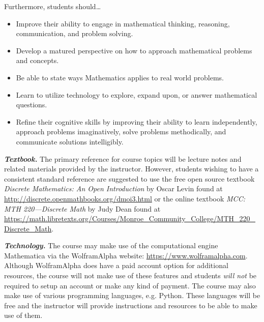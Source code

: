\documentclass[11pt,letterpaper]{article}
\begin{document}
Furthermore, students should\dots
	\begin{itemize} \itemsep=0.25ex
	\item  Improve their ability to engage in mathematical thinking, reasoning, communication, and problem solving.
	\item Develop a matured perspective on how to approach mathematical problems and concepts.
	\item Be able to state ways Mathematics applies to real world problems.
	\item Learn to utilize technology to explore, expand upon, or answer mathematical questions.
	\item Refine their cognitive skills by improving their ability to learn independently, approach problems imaginatively, solve problems methodically, and communicate solutions intelligibly.
	\end{itemize}
\sectionbreak



{\itshape\bfseries\color{stacred}Textbook.} The primary reference for course topics will be lecture notes and related materials provided by the instructor. However, students wishing to have a consistent standard reference are suggested to use the free open source textbook \textit{Discrete Mathematics: An Open Introduction} by Oscar Levin found at \url{http://discrete.openmathbooks.org/dmoi3.html} or the online textbook \textit{MCC: MTH 220---Discrete Math} by Judy Dean found at \url{https://math.libretexts.org/Courses/Monroe_Community_College/MTH_220_Discrete_Math}. \pspace

{\itshape\bfseries\color{stacred}Technology.} The course may make use of the computational engine Mathematica via the WolframAlpha website: \url{https://www.wolframalpha.com}. Although WolframAlpha does have a paid account option for additional resources, the course will not make use of these features and students {\itshape will not} be required to setup an account or make any kind of payment. The course may also make use of various programming languages, e.g. Python. These languages will be free and the instructor will provide instructions and resources to be able to make use of them. \sectionbreak






\end{document}

